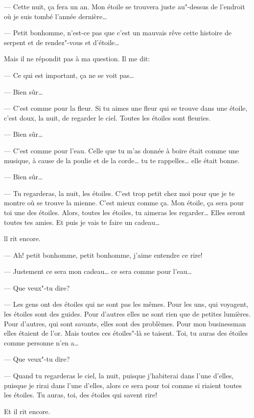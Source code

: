 --- Cette nuit, ça fera un an. Mon étoile se trouvera juste au"-dessus de
l'endroit où je suis tombé l'année dernière\ldots{}

--- Petit bonhomme, n'est-ce pas que c'est un mauvais rêve cette histoire de
serpent et de rendez"-vous et d'étoile\ldots{}

Mais il ne répondit pas à ma question. Il me dit:

--- Ce qui est important, ça ne se voit pas\ldots{}

--- Bien sûr\ldots{}

--- C'est comme pour la fleur. Si tu aimes une fleur qui se trouve dans une
étoile, c'est doux, la nuit, de regarder le ciel. Toutes les étoiles sont
fleuries.

--- Bien sûr\ldots{}

--- C'est comme pour l'eau. Celle que tu m'as donnée à boire était comme une
musique, à cause de la poulie et de la corde\ldots{} tu te rappelles\ldots{}
elle était bonne.

--- Bien sûr\ldots{}

--- Tu regarderas, la nuit, les étoiles. C'est trop petit chez moi pour que
je te montre où se trouve la mienne. C'est mieux comme ça. Mon étoile, ça
sera pour toi une des étoiles. Alors, toutes les étoiles, tu aimeras les
regarder\ldots{} Elles seront toutes tes amies. Et puis je vais te faire un
cadeau\ldots{}

ll rit encore.

--- Ah! petit bonhomme, petit bonhomme, j'aime entendre ce rire!

--- Justement ce sera mon cadeau\ldots{} ce sera comme pour l'eau\ldots{}

--- Que veux"-tu dire?

--- Les gens ont des étoiles qui ne sont pas les mêmes. Pour les uns, qui
voyagent, les étoiles sont des guides. Pour d'autres elles ne sont rien que
de petites lumières. Pour d’autres, qui sont savants, elles sont des problèmes.
Pour mon businessman elles étaient de l'or. Mais toutes ces étoiles"-là se
taisent. Toi, tu auras des étoiles comme personne n'en a\ldots{}

--- Que veux"-tu dire?

--- Quand tu regarderas le ciel, la nuit, puisque j'habiterai dans l'une
d'elles, puisque je rirai dans l'une d'elles, alors ce sera pour toi comme si
riaient toutes les étoiles. Tu auras, toi, des étoiles qui savent rire!

Et il rit encore.

